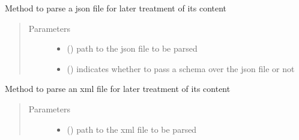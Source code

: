 \begin{fulllineitems}
\begin{fulllineitems}
\begin{quote}
\begin{description}
\end{description}\end{quote}

\end{fulllineitems}


\begin{fulllineitems}
\label{\detokenize{eboa.engine:eboa.engine.engine.Engine.parse_data_from_json}}
Method to parse a json file for later treatment of its content
\begin{quote}\begin{description}
\item[{Parameters}] \leavevmode\begin{itemize}
\item {} 
 () \textendash{} path to the json file to be parsed

\item {} 
 () \textendash{} indicates whether to pass a schema over the json file or not

\end{itemize}

\end{description}\end{quote}

\end{fulllineitems}


\begin{fulllineitems}
\label{\detokenize{eboa.engine:eboa.engine.engine.Engine.parse_data_from_xml}}
Method to parse an xml file for later treatment of its content
\begin{quote}\begin{description}
\item[{Parameters}] \leavevmode\begin{itemize}
\item {} 
 () \textendash{} path to the xml file to be parsed


\end{itemize}
\end{description}
\end{quote}
\end{fulllineitems}
\end{fulllineitems}
